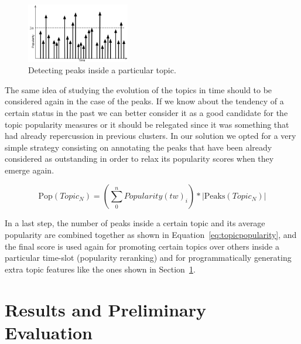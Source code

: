 \documentclass{sig-alternate}
\begin{document}
\begin{figure}[h!]
\centering
\includegraphics[width=0.4\textwidth]{figure/Peaks.png}
\caption{Detecting peaks inside a particular topic.}
\label{fig:Peaks}
\end{figure}

The same idea of studying the evolution of the topics in time should to be considered again in the case of the peaks. If we know about the tendency of a certain status in the past we can better consider it as a good candidate for the topic popularity measures or it should be relegated since it was something that had already repercussion in previous clusters. In our solution we opted for a very simple strategy consisting on annotating the peaks that have been already considered as outstanding in order to relax its popularity scores when they emerge again.

\begin{equation} \label{eq:topicpopularity}
\text{Pop}(Topic_N) =\left (\sum_{0}^{n}Popularity(tw)_i   \right )* \left |\text{Peaks}(Topic_N)  \right |
\end{equation}

In a last step, the number of peaks inside a certain topic and its average popularity are combined together as shown in Equation~\ref{eq:topicpopularity}, and the final score is used again for promoting certain topics over others inside a particular time-slot (popularity reranking) and for programmatically generating extra topic features like the ones shown in Section~\ref{sec:results}.


\section[Results and Preliminary Evaluation]{Results and Preliminary \\ Evaluation}
\label{sec:results}
\end{document}
